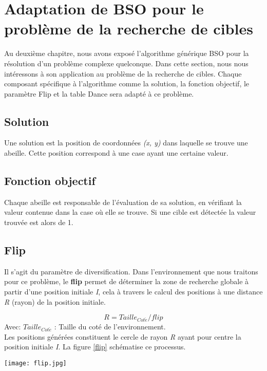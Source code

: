 \section{Adaptation de BSO pour le problème de la recherche de cibles}
Au deuxième chapitre, nous avons exposé l’algorithme générique BSO pour la résolution d’un problème complexe quelconque. Dans cette section, nous nous intéressons à son application au problème de la recherche de cibles. Chaque composant spécifique à l’algorithme comme la solution, la fonction objectif, le paramètre Flip et la table Dance sera adapté à ce problème.

\subsection{Solution}
Une solution est la position de coordonnées \textit{(x, y)} dans laquelle se trouve une abeille. Cette position correspond à une case ayant une certaine valeur.

\subsection{Fonction objectif}
Chaque abeille est responsable de l'évaluation de sa solution, en vérifiant la valeur contenue  dans la case où elle se trouve. Si une cible est détectée la valeur trouvée est alors de 1. 

\subsection{Flip} Il s'agit du paramètre de diversification. Dans l'environnement que nous traitons pour ce problème, le \textbf{flip} permet de déterminer la zone de recherche globale à partir d'une position initiale \textit{I}, cela à travers le calcul des positions à une distance \textit{R} (rayon) de la position initiale.

\begin{equation}
\label{eq:flip}
R = Taille_{Cot\acute{e}} / flip 
\end{equation}
Avec:
$Taille_{Cot\acute{e}}$ : Taille du coté de l'environnement.\\

Les positions générées constituent le cercle de rayon \textit{R} ayant pour centre la position initiale \textit{I}. La figure \ref{flip} schématise ce processus.\\

\begin{center}	  
	\texttt{[image: flip.jpg]}%
	\vspace{-0.1 cm}
	\label{flip}%
\end{center}



